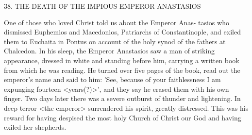 38.
THE DEATH OF THE IMPIOUS
EMPEROR ANASTASIOS

One of those who loved Christ told us about the Emperor Anas-
tasios who dismissed Euphemios and Macedonios, Patriarchs of
Constantinople, and exiled them to Euchaita in Pontus on account
of the holy synod of the fathers at Chalcedon.
In his sleep, the
Emperor Anastasios saw a man of striking appearance, dressed in
white and standing before him, carrying a written book from which
he was reading.
He turned over five pages of the book, read out the
emperor's name and said to him: 'See, because of your faithlessness
I am expunging fourteen <years(?)>', and they say he erased them
with his own finger.
Two days later there was a severe outburst of
thunder and lightening.
In deep terror <the emperor> surrendered
his spirit, greatly distressed.
This was his reward for having despised
the most holy Church of Christ our God and having exiled her
shepherds.


